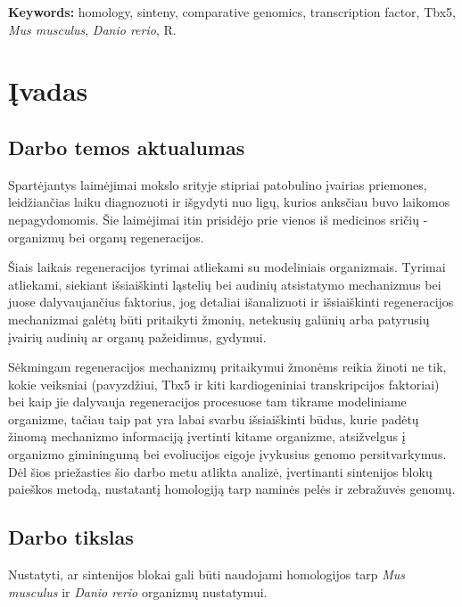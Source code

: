 \documentclass[12pt]{article}
\begin{document}
\hfill \break
\textbf{Keywords:} homology, sinteny, comparative genomics,
    transcription factor, Tbx5, \emph{Mus musculus}, \emph{Danio rerio}, R.

\newpage


\section{Įvadas}
\subsection*{Darbo temos aktualumas}
Spartėjantys laimėjimai mokslo srityje stipriai patobulino įvairias priemones,
leidžiančias laiku diagnozuoti ir išgydyti nuo ligų, kurios anksčiau buvo
laikomos nepagydomomis. Šie laimėjimai itin prisidėjo prie vienos iš medicinos
sričių - organizmų bei organų regeneracijos.

Šiais laikais regeneracijos tyrimai atliekami su modeliniais organizmais.
Tyrimai atliekami, siekiant išsiaiškinti ląstelių bei audinių atsistatymo
mechanizmus bei juose dalyvaujančius faktorius, jog detaliai išanalizuoti ir
išsiaiškinti regeneracijos mechanizmai galėtų būti pritaikyti žmonių, netekusių
galūnių arba patyrusių įvairių audinių ar organų pažeidimus, gydymui.

Sėkmingam regeneracijos mechanizmų pritaikymui žmonėms reikia žinoti ne tik,
kokie veiksniai (pavyzdžiui, Tbx5 ir kiti kardiogeniniai transkripcijos
faktoriai) bei kaip jie dalyvauja regeneracijos procesuose tam tikrame
modeliniame organizme, tačiau taip pat yra labai svarbu išsiaiškinti būdus,
kurie padėtų žinomą mechanizmo informaciją įvertinti kitame organizme,
atsižvelgus į organizmo giminingumą bei evoliucijos eigoje įvykusius genomo
persitvarkymus. Dėl šios priežasties šio darbo metu atlikta analizė, įvertinanti
sintenijos blokų paieškos metodą, nustatantį homologiją tarp naminės pelės ir
zebražuvės genomų.

\subsection*{Darbo tikslas}

Nustatyti, ar sintenijos blokai gali būti naudojami homologijos tarp
\emph{Mus musculus} ir \emph{Danio rerio} organizmų nustatymui.
\end{document}
